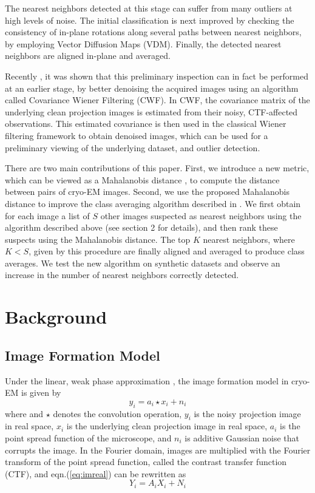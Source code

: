 \documentclass{article}
\begin{document}
The nearest neighbors detected at this stage can suffer from many outliers at high levels of noise. The initial classification is next improved by checking the consistency of in-plane rotations along several paths between nearest neighbors, by employing Vector Diffusion Maps (VDM)\cite{vdm}. Finally, the detected nearest neighbors are aligned in-plane and averaged. 

Recently \cite{cwf}, it was shown that this preliminary inspection can in fact be performed at an earlier stage, by better denoising the acquired images using an algorithm called Covariance Wiener Filtering (CWF). In CWF, the covariance matrix of the underlying clean projection images is estimated from their noisy, CTF-affected observations. This estimated covariance is then used in the classical Wiener filtering framework to obtain denoised images, which can be used for a preliminary viewing of the underlying dataset, and outlier detection. 

There are two main contributions of this paper. First, we introduce a new metric, which can be viewed as a Mahalanobis distance \cite{mah}, to compute the distance between pairs of cryo-EM images. Second, we use the proposed Mahalanobis distance to improve the class averaging algorithm described in \cite{zhao}. We first obtain for each image a list of $S$ other images suspected as nearest neighbors using the algorithm described above (see section 2 for details), and then rank these suspects using the Mahalanobis distance. The top $K$ nearest neighbors, where $K<S$, given by this procedure are finally aligned and averaged to produce class averages. We test the new algorithm on synthetic datasets and observe an increase in the number of nearest neighbors correctly detected.

\section{Background}
\subsection{Image Formation Model}
Under the linear, weak phase approximation \cite{frankbook}, the image formation model in cryo-EM is given by
\begin{equation}
y_i = a_i\star x_i + n_i
\label{eq:imreal}
\end{equation}
where and $\star$ denotes the convolution operation, $y_i$ is the noisy projection image in real space, $x_i$ is the underlying clean projection image in real space, $a_i$ is the point spread function of the microscope, and $n_i$ is additive Gaussian noise that corrupts the image. In the Fourier domain, images are multiplied with the Fourier transform of the point spread function, called the contrast transfer function (CTF), and eqn.(\ref{eq:imreal}) can be rewritten as
\begin{equation}
Y_i = A_iX_i + N_i
\label{eq:imfour}
\end{equation}
\end{document}
